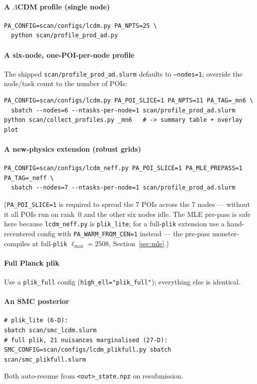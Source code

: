 \documentclass[11pt]{article}
\newcommand{\code}[1]{\texttt{\small #1}}
\newcommand{\file}[1]{\texttt{\small #1}}
\newcommand{\Lmax}{\ell_{\max}}
\begin{document}
\paragraph{A $\Lambda$CDM profile (single node)}
\begin{lstlisting}
PA_CONFIG=scan/configs/lcdm.py PA_NPTS=25 \
  python scan/profile_prod_ad.py
\end{lstlisting}

\paragraph{A six-node, one-POI-per-node profile}
The shipped \file{scan/profile\_prod\_ad.slurm} defaults to \code{--nodes=1};
override the node/task count to the number of POIs:
\begin{lstlisting}
PA_CONFIG=scan/configs/lcdm.py PA_POI_SLICE=1 PA_NPTS=11 PA_TAG=_mn6 \
  sbatch --nodes=6 --ntasks-per-node=1 scan/profile_prod_ad.slurm
python scan/collect_profiles.py _mn6   # -> summary table + overlay plot
\end{lstlisting}

\paragraph{A new-physics extension (robust grids)}
\begin{lstlisting}
PA_CONFIG=scan/configs/lcdm_neff.py PA_POI_SLICE=1 PA_MLE_PREPASS=1 PA_TAG=_neff \
  sbatch --nodes=7 --ntasks-per-node=1 scan/profile_prod_ad.slurm
\end{lstlisting}
(\code{PA\_POI\_SLICE=1} is required to spread the $7$ POIs across the $7$
nodes --- without it all POIs run on rank~0 and the other six nodes idle.
The MLE pre-pass is safe here because \code{lcdm\_neff.py} is
\code{plik\_lite}; for a full-\code{plik} extension use a hand-recentered
config with \code{PA\_WARM\_FROM\_CEN=1} instead --- the pre-pass
monster-compiles at full-\code{plik} $\Lmax=2508$, Section~\ref{sec:mle}.)

\paragraph{Full Planck plik}
Use a \code{plik\_full} config (\code{high\_ell="plik\_full"}); everything
else is identical.

\paragraph{An SMC posterior}
\begin{lstlisting}
# plik_lite (6-D):
sbatch scan/smc_lcdm.slurm
# full plik, 21 nuisances marginalised (27-D):
SMC_CONFIG=scan/configs/lcdm_plikfull.py sbatch scan/smc_plikfull.slurm
\end{lstlisting}
Both auto-resume from \file{<out>\_state.npz} on resubmission.
\end{document}
